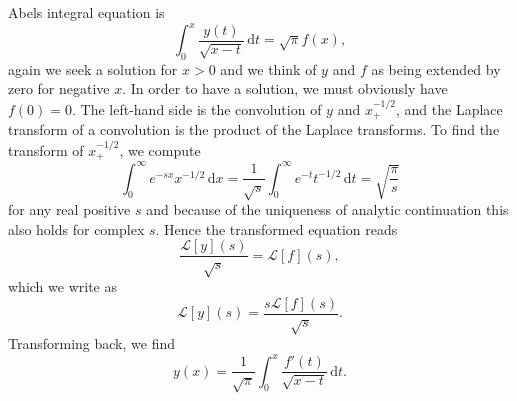 \begin{Example}
\label{ex:abel-integral-equation-laplace}
Abel\textquotesingle s integral equation is
\begin{equation}\label{eq:abel-integral-equation}
\int_0^x\dfrac{y(t)}{\sqrt{x-t}}\,\mathrm{d}t=\sqrt\pi f(x),
\end{equation}
again we seek a solution for $x>0$ and we think of $y$ and $f$ as being extended by zero for negative $x$. In order to have a solution, we must obviously have $f(0)=0$. The left-hand side is the convolution of $y$ and $x_+^{-1/2}$, and the Laplace transform of a convolution is the product of the Laplace transforms. To find the transform of $x_+^{-1/2}$, we compute
\begin{equation}\label{eq:laplace-inverse-square-root-kernel}
\int_0^\infty e^{-sx}x^{-1/2}\,\mathrm{d}x=\dfrac1{\sqrt s}\int_0^\infty e^{-t}t^{-1/2}\,\mathrm{d}t=\sqrt{\dfrac\pi s}
\end{equation}
for any real positive $s$ and because of the uniqueness of analytic continuation this also holds for complex $s$. Hence the transformed equation reads
\begin{equation}\label{eq:abel-equation-laplace-transform}
\dfrac{\mathcal{L}[y](s)}{\sqrt s}=\mathcal{L}[f](s),
\end{equation}
which we write as
\begin{equation}\label{eq:abel-equation-transform-solution}
\mathcal{L}[y](s)=\dfrac{s\mathcal{L}[f](s)}{\sqrt s}.
\end{equation}
Transforming back, we find
\begin{equation}\label{eq:abel-equation-inverse-transform-solution}
y(x)=\dfrac1{\sqrt\pi}\int_0^x\dfrac{f'(t)}{\sqrt{x-t}}\,\mathrm{d}t.
\end{equation}

\end{Example}

